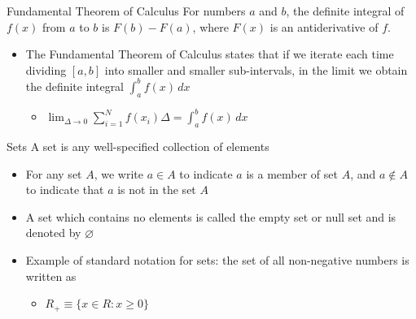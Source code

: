\documentclass[aspectratio=169]{beamer}
\begin{document}
\begin{frame}{Fundamental Theorem of Calculus}\label{main1}
	For numbers $a$ and $b$, the definite integral of $f(x)$ from $a$ to $b$ is $F(b) - F(a)$, where $F(x)$ is an antiderivative of $f$.
\begin{itemize}
	\begin{itemize}
		\item $\int_a^b f(x) \, dx = F(b) - F(a)$ where $F' = f$
	\end{itemize}
	\item The Fundamental Theorem of Calculus states that if we iterate each time dividing $[a,b]$ into smaller and smaller sub-intervals, in the limit we obtain the definite integral $\int_a^b f(x) \, dx$
		\begin{itemize}
		\item $\lim_{\Delta \to 0} \sum_{i=1}^{N} f(x_{i})\Delta = \int_a^b f(x) \, dx$
	\end{itemize}
\end{itemize}
\end{frame}

\begin{frame}{Sets}\label{main1}
	A set is any well-specified collection of elements
\begin{itemize}
	\begin{itemize}
		\item For any set $A$, we write $a \in A$ to indicate $a$ is a member of set $A$, and $a \notin A$ to indicate that $a$ is not in the set $A$
		\item A set which contains no elements is called the empty set or null set and is denoted by $\varnothing$
		\item Example of standard notation for sets: the set of all non-negative numbers is written as
		\begin{itemize}
			\item $ R_{+} \equiv \{x \in R : x \geq 0 \} $
		\end{itemize}
	\end{itemize}
\end{itemize}
\end{frame}
\end{document}
